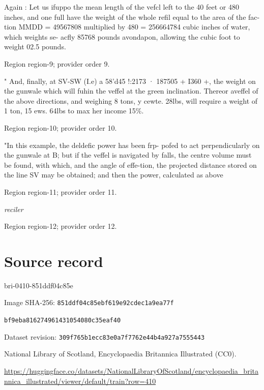 \documentclass[11pt]{article}
\begin{document}
Again : Let us ifuppo the mean length of the vefcl left to the 40 feet or 480 inches, and one full have the weight of the whole refil equal to the area of the fac- tion MMDD = 49567808 multiplied by 480 = 256664784 cubic inches of water, which weights se- acfly 85768 pounds avondapon, allowing the cubic foot to weight 02.5 pounds.
\par

{\scriptsize\color{gray} Region region-9; provider order 9.\par}
\medskip

" And, finally, at SV-SW (I.e) a 58'd45 !:2173 · 187505 + I360 +, the weight on the gunwale which will fuhin the veffel at the green inclination. Thereor aveffel of the above directions, and weighing 8 tons, y cewte. 28lbs, will require a weight of 1 ton, 15 ews. 64lbs to max her income 15\%.
\par

{\scriptsize\color{gray} Region region-10; provider order 10.\par}
\medskip

"In this example, the deldefic power has been frp- pofed to act perpendicularly on the gunwale at B; but if the veffel is navigated by falls, the centre volume must be found, with which, and the angle of effe-tion, the projected distance stored on the line SV may be obtained; and then the power, calculated as above
\par

{\scriptsize\color{gray} Region region-11; provider order 11.\par}
\medskip

{\small\itshape reciler\par}

{\scriptsize\color{gray} Region region-12; provider order 12.\par}
\medskip
\newpage\section*{Source record}
bri-0410-851ddf04c85e\par
Image SHA-256: \texttt{851ddf04c85ebf619e92cdec1a9ea77f}\par\texttt{bf9eba816274961431054080c35eaf40}\par
Dataset revision: \texttt{309f765b1ecc83e0a7f7}\texttt{762e44b4a927a7555443}\par
National Library of Scotland, Encyclopaedia Britannica Illustrated (CC0).\par
\url{https://huggingface.co/datasets/NationalLibraryOfScotland/encyclopaedia_britannica_illustrated/viewer/default/train?row=410}
\end{document}
